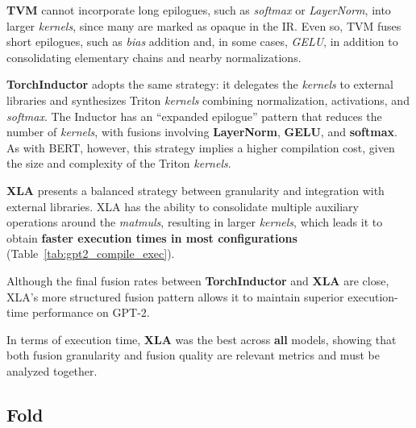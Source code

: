 \documentclass[sigconf,anonymous]{acmart}
\begin{document}
\textbf{TVM} cannot incorporate long epilogues, such as \textit{softmax} or \textit{LayerNorm}, into larger \emph{kernels}, since many are marked as opaque in the IR. Even so, TVM fuses short epilogues, such as \textit{bias} addition and, in some cases, \textit{GELU}, in addition to consolidating elementary chains and nearby normalizations.

\textbf{TorchInductor} adopts the same strategy: it delegates the \textit{kernels} to external libraries and synthesizes Triton \emph{kernels} combining normalization, activations, and \textit{softmax}. The Inductor has an ``expanded epilogue'' pattern that reduces the number of \emph{kernels}, with fusions involving \textbf{LayerNorm}, \textbf{GELU}, and \textbf{softmax}. As with BERT, however, this strategy implies a higher compilation cost, given the size and complexity of the Triton \emph{kernels}.

\textbf{XLA} presents a balanced strategy between granularity and integration with external libraries. XLA has the ability to consolidate multiple auxiliary operations around the \textit{matmuls}, resulting in larger \textit{kernels}, which leads it to obtain \textbf{faster execution times in most configurations} (Table~\ref{tab:gpt2_compile_exec}).

Although the final fusion rates between \textbf{TorchInductor} and \textbf{XLA} are close, XLA's more structured fusion pattern allows it to maintain superior execution-time performance on GPT-2.

In terms of execution time, \textbf{XLA} was the best across \textbf{all} models, showing that both fusion granularity and fusion quality are relevant metrics and must be analyzed together.

\subsection{Fold}

\begin{table}[h]
\centering
\caption{ResNet-18 (TorchInductor) --- effect of folding BN into Conv: compilation/execution times (ms).}
\label{tab:resnet18_fold_bn}
\small
{}
\end{table}
\end{document}
